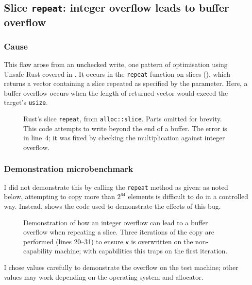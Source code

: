 \documentclass[dissertation.tex]{subfiles}
\begin{document}
\subsection{Slice \texttt{repeat}: integer overflow leads to buffer overflow}
\label{sec:eval-micro-repeat}

\subsubsection{Cause}
This flaw arose from an unchecked write, one pattern of optimisation
using Unsafe Rust covered in .
It occurs in the \texttt{repeat} function on slices
(), which returns a vector containing a slice
repeated as specified by the parameter.
Here, a buffer overflow occurs when the length of returned vector would
exceed the target's \texttt{usize}.

\begin{figure}[ht]
    
    \caption{
        Rust's slice \texttt{repeat}, from \texttt{alloc::slice}.
        Parts omitted for brevity.
        This code attempts to write beyond the end of a buffer.
        The error is in line~4; it was fixed by checking the
        multiplication against integer overflow.
    }
    \label{lst:slice-repeat}
\end{figure}

\subsubsection{Demonstration microbenchmark}
I did not demonstrate this by calling the \texttt{repeat} method as
given: as noted below, attempting to copy more than \(2^{64}\) elements
is difficult to do in a controlled way.
Instead,  shows the code used to demonstrate the
effects of this bug.

\begin{figure}[ht]
    
    \caption{
        Demonstration of how an integer overflow can lead to a buffer
        overflow when repeating a slice.
        Three iterations of the copy are performed (lines 20--31) to
        ensure \texttt{v} is overwritten on the non-capability machine;
        with capabilities this traps on the first iteration.
    }
    \label{lst:micro-repeat}
\end{figure}

I chose values carefully to demonstrate the overflow on the test
machine; other values may work depending on the operating system and
allocator.
\end{document}
